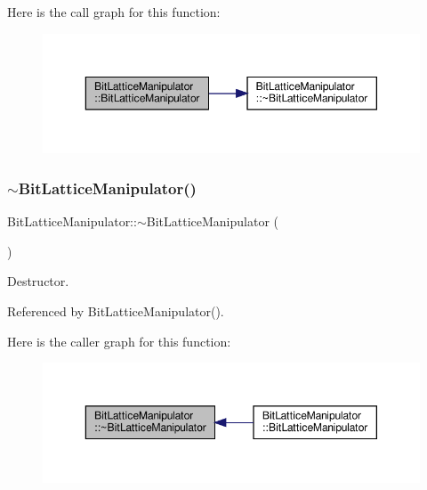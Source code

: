 Here is the call graph for this function\+:
\nopagebreak
\begin{figure}[H]
\begin{center}
\leavevmode
\includegraphics[width=350pt]{dd/d98/classBitLatticeManipulator_a17e7c6938897e42d193caab62b84a8de_cgraph}
\end{center}
\end{figure}
\mbox{\label{classBitLatticeManipulator_a299037063b6c527561af4021f65685d8}} 
\subsubsection{\texorpdfstring{$\sim$\+Bit\+Lattice\+Manipulator()}{~BitLatticeManipulator()}}
{\footnotesize\ttfamily Bit\+Lattice\+Manipulator\+::$\sim$\+Bit\+Lattice\+Manipulator (\begin{DoxyParamCaption}{ }\end{DoxyParamCaption})\hspace{0.3cm}{\ttfamily [default]}}



Destructor. 



Referenced by Bit\+Lattice\+Manipulator().

Here is the caller graph for this function\+:
\nopagebreak
\begin{figure}[H]
\begin{center}
\leavevmode
\includegraphics[width=350pt]{dd/d98/classBitLatticeManipulator_a299037063b6c527561af4021f65685d8_icgraph}
\end{center}
\end{figure}


